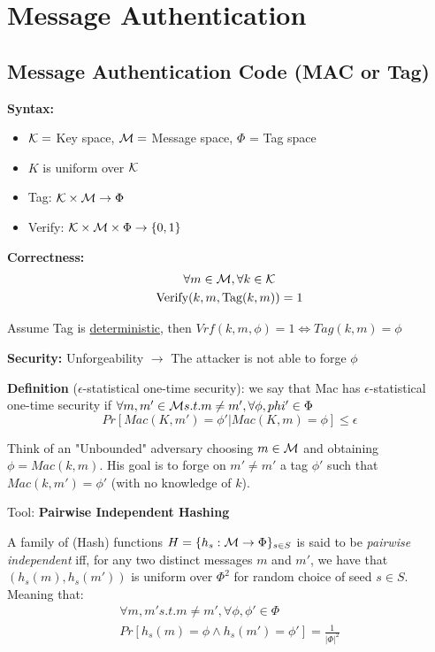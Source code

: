 
\section{Message Authentication}

\subsection{Message Authentication Code (MAC or Tag)}

\textbf{Syntax:}

\begin{itemize}
    \item $\mathcal{K} =$ Key space, $\mathcal{M}=$ Message space, $\Phi$ = Tag space
    \item $K$ is uniform over $\mathcal{K}$
    \item Tag: $\mathcal{K} \times \mathcal{M} \to \Phi$
    \item Verify: $\mathcal{K} \times \mathcal{M} \times \Phi \to \{0,1\}$
\end{itemize}

\textbf{Correctness:}
\begin{gather*}
    \forall m \in \mathcal{M}, \forall k \in \mathcal{K} \\
    \text{Verify}(k,m,\text{Tag}(k,m))=1    
\end{gather*}

Assume Tag is \underline{deterministic}, then $Vrf(k,m,\phi)=1 \Leftrightarrow Tag(k,m)=\phi$

\noindent\textbf{Security:} Unforgeability $\rightarrow$ The attacker is not able to forge $\phi$

\noindent\textbf{Definition} ($\epsilon$-statistical one-time security): we say that Mac has $\epsilon$-statistical one-time security if
$\forall m,m' \in \mathcal{M} s.t. m\neq m', \forall \phi,phi' \in \Phi$
$$Pr[Mac(K,m')=\phi'|Mac(K,m)=\phi]\leq \epsilon$$

\noindent Think of an "Unbounded" adversary choosing $m \in \mathcal{M}$ and obtaining $\phi=Mac(k,m)$. His goal is to forge on $m'\neq m'$ a tag $\phi'$ such that $Mac(k,m')=\phi'$ (with no knowledge of $k$).

\bigskip
Tool:\textbf{ Pairwise Independent Hashing} 
\begin{definition}
    A family of (Hash) functions $H=\{h_s:\mathcal{M} \to \Phi\}_{s\in S}$ is said to be \emph{pairwise independent} iff, for any two distinct messages $m$ and $m'$, we have that $(h_s(m),h_s(m'))$ is uniform over $\Phi^2$ for random choice of seed $s \in S$. Meaning that:
    \begin{gather*}
        \forall m,m' s.t. m\neq m',\forall \phi,\phi' \in \Phi \\
        Pr[h_s(m)=\phi \wedge h_s(m')=\phi']=\frac{1}{|\Phi|^2}
    \end{gather*}
\end{definition}

